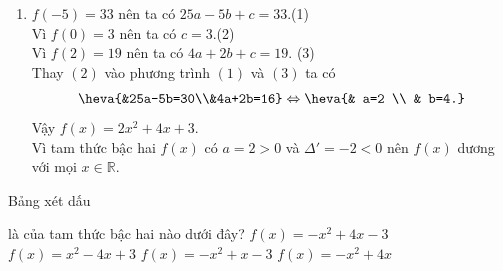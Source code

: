 \begin{bt}
{\begin{enumerate}
			\begin{align*}
				\heva{&4a+2b=8\\&9a+3b=15}\Leftrightarrow \heva{& a=1 \\ & b=2.}
			\end{align*}
			Vậy $f(x)=x^2+2x-2$.\\
			Vì tam thức bậc hai $f(x)$ có $a=1>0$ và hai nghiệm $x_1=-1-\sqrt{3}$ và $x_2=-1+\sqrt{3}$ nên $f(x)$ âm trong khoảng $(-1-\sqrt{3};-1+\sqrt{3})$ và dương trong các khoảng $(-\infty;-1-\sqrt{3})$ và $(-1+\sqrt{3};+\infty)$.
			\item $f(-5)=33$ nên ta có $25a-5b+c=33$.\quad (1)\\
			Vì $f(0)=3$ nên ta có $c=3$.\quad (2)\\
			Vì $f(2)=19$ nên ta có $4a+2b+c=19$. \quad (3)\\
			Thay $(2)$ vào phương trình $(1)$ và $(3)$ ta có
			\begin{align*}
				\heva{&25a-5b=30\\&4a+2b=16}\Leftrightarrow \heva{& a=2 \\ & b=4.}
			\end{align*}
			Vậy $f(x)=2x^2+4x+3$.\\
			Vì tam thức bậc hai $f(x)$ có $a=2>0$ và $\Delta'=-2<0$ nên $f(x)$ dương với mọi $x \in \mathbb{R}$.
		\end{enumerate}
	}
\end{bt}

\begin{ex}%
	Bảng xét dấu 
	\begin{center}
	\end{center}
	là của tam thức bậc hai nào dưới đây? 
	\choice 
		 {\True $f(x)=-x^2 +4x -3$}
		{$f(x)=x^2  -4x +3$}
		{$f(x)=-x^2  +x -3$}
		{$f(x)=-x^2  +4x $}
\end{ex}

